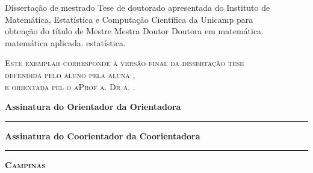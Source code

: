 \vspace{.5cm}
\begin{flushright}
    \begin{minipage}[c]{.8\textwidth}
        \begin{flushright}
            \ifx\mestrado\undefined
            Disserta\c{c}\~{a}o de mestrado
            \else
            Tese de doutorado
            \fi
            apresentada do Instituto de \\ Matem\'atica,
            Estat\'istica e Computa\c c\~ao Cient\'ifica
            da Unicamp para \\ obten\c c\~ao do t\'itulo de
            \ifx\mestrado\undefined
                \ifx\femaleAuthor\undefined
                Mestre
                \else
                Mestra
                \fi
            \else
                \ifx\femaleAuthor\undefined
                Doutor
                \else
                Doutora
                \fi
            \fi
            em
            \ifx\matematica\undefined
            \else
            matem\'{a}tica.
            \fi
            \ifx\aplicada\undefined
            \else
            matem\'{a}tica aplicada.
            \fi
            \ifx\estatistica\undefined
            \else
            estat\'{i}stica.
            \fi
        \end{flushright}
    \end{minipage}
\end{flushright}
\vspace{.5cm}
\noindent
{\footnotesize \scshape
Este exemplar corresponde \`a vers\~ao final da 
\ifx\mestrado\undefined
disserta\c{c}\~{a}o
\else
tese
\fi \\
defendida 
\ifx\femaleAuthor\undefined
pelo aluno
\else
pela aluna
\fi
\autor,\\
e orientada pel\ifx\femaleOrientador\undefined
o\else
a\fi Prof\ifx\femaleOrientador\undefined
\else
a\fi. Dr\ifx\femaleOrientador\undefined
\else
a\fi. \orientador.
}
\vspace{1cm}

\noindent
{\small \bfseries
\noindent
Assinatura
\ifx\femaleOrientador\undefined
do Orientador
\else
da Orientadora
\fi

\vspace{.7cm}
\noindent
\rule[1pt]{7cm}{.5pt}  %
}
\vspace{.5cm}


\ifx\coorientador\undefined
\else
{\small \bfseries
\noindent
Assinatura
\ifx\femaleCoorientador\undefined
do Coorientador
\else
da Coorientadora
\fi

\vspace{.7cm}
\noindent
\rule[1pt]{7cm}{.5pt}  %
}
\fi
\vfill
\begin{center}
    {\small \scshape \bfseries Campinas \\ \ano}
\end{center}
